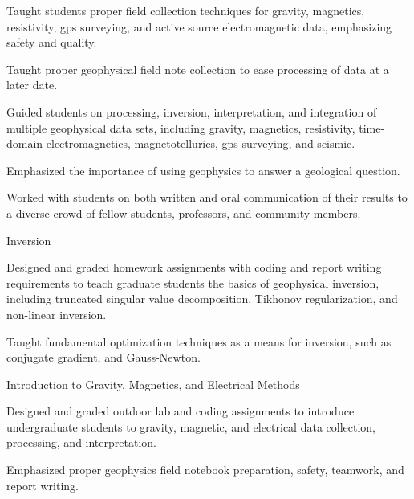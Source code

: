 \begin{cventries}
{\begin{cvitems}
        \item {Taught students proper field collection techniques for gravity, magnetics, resistivity, gps surveying, and active source electromagnetic data, emphasizing safety and quality.}
        \item {Taught proper geophysical field note collection to ease processing of data at a later date.}
        \item {Guided students on processing, inversion, interpretation, and integration of multiple geophysical data sets, including gravity, magnetics, resistivity, time-domain electromagnetics, magnetotellurics, gps surveying, and seismic.}
        \item {Emphasized the importance of using geophysics to answer a geological question.}
        \item {Worked with students on both written and oral communication of their results to a diverse crowd of fellow students, professors, and community members.}
        \vspace{10pt}
      \end{cvitems}
      \begin{cvparagraph}
      \vspace{7pt}
      Inversion
      \vspace{7pt}
      \end{cvparagraph}
      \begin{cvitems} %
        \item {Designed and graded homework assignments with coding and report writing requirements to teach graduate students the basics of geophysical inversion, including truncated singular value decomposition, Tikhonov regularization, and non-linear inversion.}
        \item {Taught fundamental optimization techniques as a means for inversion, such as conjugate gradient, and Gauss-Newton.}
        \vspace{10pt}
      \end{cvitems}
      \begin{cvparagraph}
      \vspace{7pt}
      Introduction to Gravity, Magnetics, and Electrical Methods
      \vspace{7pt}
      \end{cvparagraph}
      \begin{cvitems} %
        \item {Designed and graded outdoor lab and coding assignments to introduce undergraduate students to gravity, magnetic, and electrical data collection, processing, and interpretation.}
        \item {Emphasized proper geophysics field notebook preparation, safety, teamwork, and report writing.}
      \end{cvitems}
    }


\end{cventries}
